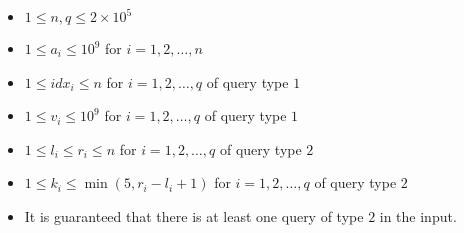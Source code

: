 \begin{itemize}
\tightlist
\item $1 \leq n, q \leq 2 \times 10^5$
\item $1 \leq a_i \leq 10^9$ for $i = 1, 2, \ldots, n$
\item $1 \leq idx_i \leq n$ for $i = 1, 2, \ldots, q$ of query type $1$
\item $1 \leq v_i \leq 10^9$ for $i = 1, 2, \ldots, q$ of query type $1$
\item $1 \leq l_i \leq r_i \leq n$ for $i = 1, 2, \ldots, q$ of query type $2$
\item $1 \leq k_i \leq \min(5, r_i - l_i + 1)$ for $i = 1, 2, \ldots, q$ of query type $2$
\item It is guaranteed that there is at least one query of type $2$ in the input.
\end{itemize}
